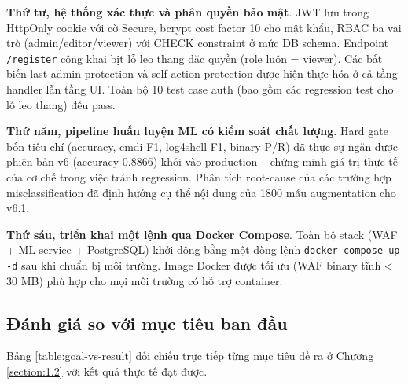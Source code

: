 \documentclass[../DoAn.tex]{subfiles}
\begin{document}
\textbf{Thứ tư, hệ thống xác thực và phân quyền bảo mật}. JWT lưu trong
HttpOnly cookie với cờ Secure, bcrypt cost factor 10 cho mật khẩu, RBAC
ba vai trò (admin/editor/viewer) với CHECK constraint ở mức DB schema.
Endpoint \texttt{/register} công khai bịt lỗ leo thang đặc quyền (role
luôn = viewer). Các bất biến last-admin protection và self-action protection
được hiện thực hóa ở cả tầng handler lẫn tầng UI. Toàn bộ 10 test case
auth (bao gồm các regression test cho lỗ leo thang) đều pass.

\textbf{Thứ năm, pipeline huấn luyện ML có kiểm soát chất lượng}. Hard
gate bốn tiêu chí (accuracy, cmdi F1, log4shell F1, binary P/R) đã thực
sự ngăn được phiên bản v6 (accuracy 0.8866) khỏi vào production --
chứng minh giá trị thực tế của cơ chế trong việc tránh regression. Phân
tích root-cause của các trường hợp misclassification đã định hướng cụ thể
nội dung của 1800 mẫu augmentation cho v6.1.

\textbf{Thứ sáu, triển khai một lệnh qua Docker Compose}. Toàn bộ stack
(WAF + ML service + PostgreSQL) khởi động bằng một dòng lệnh
\texttt{docker compose up -d} sau khi chuẩn bị môi trường. Image Docker
được tối ưu (WAF binary tĩnh < 30 MB) phù hợp cho mọi môi trường có hỗ
trợ container.

\subsection{Đánh giá so với mục tiêu ban đầu}
\label{subsection:6.1.2}

Bảng \ref{table:goal-vs-result} đối chiếu trực tiếp từng mục tiêu đề ra ở
Chương \ref{section:1.2} với kết quả thực tế đạt được.
\end{document}
